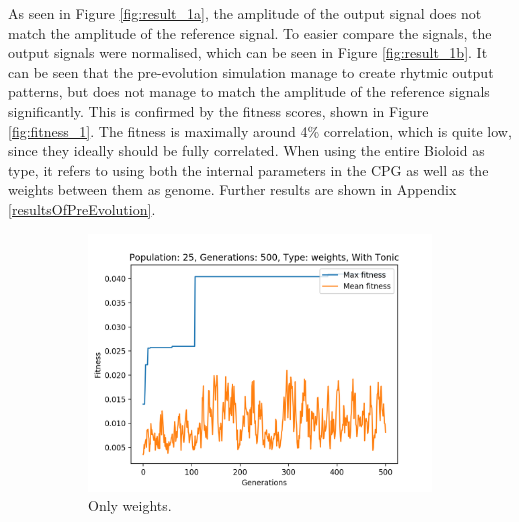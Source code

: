 As seen in Figure \ref{fig:result_1a}, the amplitude of the output signal does not match the amplitude of the reference signal. To easier compare the signals, the output signals were normalised, which can be seen in Figure \ref{fig:result_1b}. It can be seen that the pre-evolution simulation manage to create rhytmic output patterns, but does not manage to match the amplitude of the reference signals significantly. This is confirmed by the fitness scores, shown in Figure \ref{fig:fitness_1}. The fitness is maximally around 4\% correlation, which is quite low, since they ideally should be fully correlated. When using the entire Bioloid as type, it refers to using both the internal parameters in the CPG as well as the weights between them as genome. Further results are shown in Appendix \ref{resultsOfPreEvolution}.

\begin{figure}[htbp]
    \centering
    \begin{subfigure}[b]{0.5\textwidth}
        \centering
        \includegraphics[width=1\textwidth]{include/figure/fitness_over_time_pop25_gen500_type0_with.png}
        \caption{Only weights. \vspace{0.5cm}}
        \label{fig:fitness_1a}
    \end{subfigure}%
    ~ 
    \begin{subfigure}[b]{0.5\textwidth}
        \centering

\end{subfigure}
\end{figure}
